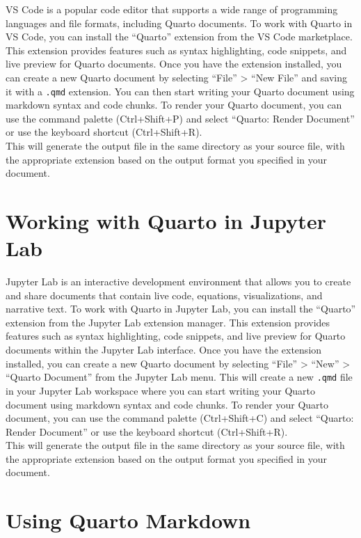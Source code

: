\documentclass[
  letterpaper,
  DIV=11,
  numbers=noendperiod,
  oneside]{scrreprt}
\begin{document}
\begin{tcolorbox}
VS Code is a popular code editor that supports a wide range of
programming languages and file formats, including Quarto documents. To
work with Quarto in VS Code, you can install the ``Quarto'' extension
from the VS Code marketplace. This extension provides features such as
syntax highlighting, code snippets, and live preview for Quarto
documents. Once you have the extension installed, you can create a new
Quarto document by selecting ``File'' \textgreater{} ``New File'' and
saving it with a \texttt{.qmd} extension. You can then start writing
your Quarto document using markdown syntax and code chunks. To render
your Quarto document, you can use the command palette (Ctrl+Shift+P) and
select ``Quarto: Render Document'' or use the keyboard shortcut
(Ctrl+Shift+R).\\
This will generate the output file in the same directory as your source
file, with the appropriate extension based on the output format you
specified in your document.

\section{Working with Quarto in Jupyter
Lab}\label{working-with-quarto-in-jupyter-lab}

Jupyter Lab is an interactive development environment that allows you to
create and share documents that contain live code, equations,
visualizations, and narrative text. To work with Quarto in Jupyter Lab,
you can install the ``Quarto'' extension from the Jupyter Lab extension
manager. This extension provides features such as syntax highlighting,
code snippets, and live preview for Quarto documents within the Jupyter
Lab interface. Once you have the extension installed, you can create a
new Quarto document by selecting ``File'' \textgreater{} ``New''
\textgreater{} ``Quarto Document'' from the Jupyter Lab menu. This will
create a new \texttt{.qmd} file in your Jupyter Lab workspace where you
can start writing your Quarto document using markdown syntax and code
chunks. To render your Quarto document, you can use the command palette
(Ctrl+Shift+C) and select ``Quarto: Render Document'' or use the
keyboard shortcut (Ctrl+Shift+R).\\
This will generate the output file in the same directory as your source
file, with the appropriate extension based on the output format you
specified in your document.

\section{Using Quarto Markdown}\label{using-quarto-markdown}


\end{tcolorbox}
\end{document}
